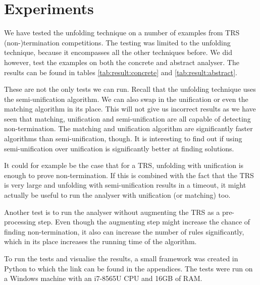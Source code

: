 \chapter{Experiments}\label{experiments}
We have tested the unfolding technique on a number of examples from TRS (non-)termination competitions\cite{TermPortal}. The testing was limited to the unfolding technique, because it encompasses all the other techniques before. We did however, test the examples on both the concrete and abstract analyser. The results can be found in tables \ref{tab:result:concrete} and \ref{tab:result:abstract}.

These are not the only tests we can run. Recall that the unfolding technique uses the semi-unification algorithm. We can also swap in the unification or even the matching algorithm in its place. This will not give us incorrect results as we have seen that matching, unification and semi-unification are all capable of detecting non-termination. The matching and unification algorithm are significantly faster algorithms than semi-unification, though. It is interesting to find out if using semi-unification over unification is significantly better at finding solutions. 

It could for example be the case that for a TRS, unfolding with unification is enough to prove non-termination. If this is combined with the fact that the TRS is very large and unfolding with semi-unification results in a timeout, it might actually be useful to run the analyser with unification (or matching) too. 

Another test is to run the analyser without augmenting the TRS as a pre-processing step. Even though the augmenting step might increase the chance of finding non-termination, it also can increase the number of rules significantly, which in its place increases the running time of the algorithm. 

To run the tests and visualise the results, a small framework was created in Python to which the link can be found in the appendices. The tests were run on a Windows machine with an i7-8565U CPU and 16GB of RAM. 

